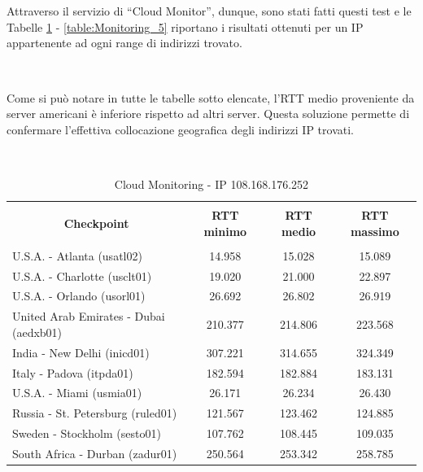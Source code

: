 \documentclass[a4paper,11pt]{book}
\begin{document}
~

~

Attraverso il servizio di ``Cloud Monitor'', dunque, sono stati fatti questi test e le Tabelle \ref{table:Monitoring_1} - \ref{table:Monitoring_5} riportano i risultati ottenuti per un IP appartenente ad ogni range di indirizzi trovato.

~

Come si pu\`o notare in tutte le tabelle sotto elencate, l'RTT medio proveniente da server americani è inferiore rispetto ad altri server. Questa soluzione permette di confermare l'effettiva collocazione geografica degli indirizzi IP trovati.

~

\begin{table}[!ht]
\caption{Cloud Monitoring - IP 108.168.176.252}\label{table:Monitoring_1}
\begin{tabular}{|l|c|c|c|}
\hline
\multicolumn{1}{|c|}{\textbf{}} & {\textbf{}} & {\textbf{}} & {\textbf{}}\\
\multicolumn{1}{|c|}{\textbf{Checkpoint}} & {\textbf{RTT minimo}} & {\textbf{RTT medio}} & {\textbf{RTT massimo}}\\
\multicolumn{1}{|c|}{\textbf{}} & {\textbf{}} & {\textbf{}} & {\textbf{}}\\
\hline
U.S.A. - Atlanta (usatl02) & 14.958 & 15.028 & 15.089\\
U.S.A. - Charlotte (usclt01) & 19.020 & 21.000 & 22.897\\
U.S.A. - Orlando (usorl01) & 26.692 & 26.802 & 26.919\\
United Arab Emirates - Dubai (aedxb01) & 210.377 & 214.806 & 223.568\\
India - New Delhi (inicd01) & 307.221 & 314.655 & 324.349\\
Italy - Padova (itpda01) & 182.594 & 182.884 & 183.131\\
U.S.A. - Miami (usmia01) & 26.171 & 26.234 & 26.430\\
Russia - St. Petersburg (ruled01) & 121.567 & 123.462 & 124.885\\
Sweden - Stockholm (sesto01) & 107.762 & 108.445 & 109.035\\
South Africa - Durban (zadur01) & 250.564 & 253.342 & 258.785\\
\hline
\end{tabular}
\end{table}

~
\end{document}
